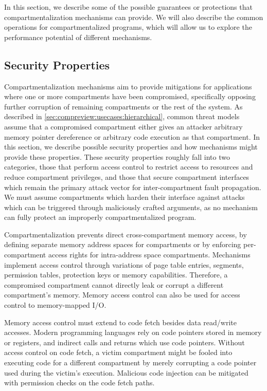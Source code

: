 In this section, we describe some of the possible guarantees or protections
that compartmentalization mechanisms can provide.
We will also describe the common operations for compartmentalized programs,
which will allow us to explore the performance potential of different
mechanisms.

\subsection{Security Properties}
Compartmentalization mechanisms aim to provide mitigations for applications
where one or more compartments have been compromised, specifically opposing
further corruption of remaining compartments or the rest of the system.
As described in \autoref{sec:compreview:usecases:hierarchical}, common threat
models assume that a compromised compartment either gives an attacker arbitrary
memory pointer dereference or arbitrary code execution as that compartment.
In this section, we describe possible security properties and how mechanisms
might provide these properties.
These security properties roughly fall into two categories, those that
perform access control to restrict access to resources and reduce
compartment privileges, and those that secure compartment interfaces
which remain the primary attack vector for inter-compartment fault propagation.
We must assume compartments which harden their interface against attacks
which can be triggered through maliciously crafted arguments, as no
mechanism can fully protect an improperly compartmentalized program.


Compartmentalization prevents direct cross-compartment memory access, by 
defining separate memory address spaces for compartments or by 
enforcing per-compartment access rights for intra-address space compartments.
Mechanisms implement access control through variations of page table entries,
segments, permission tables, protection keys or memory capabilities.
Therefore, a compromised compartment cannot directly leak or corrupt a 
different compartment's memory.
Memory access control can also be used for access control to memory-mapped
I/O.

Memory access control must extend to code fetch besides data read/write
accesses.
Modern programming languages rely on code pointers stored in memory or
registers, and indirect calls and returns which use code pointers.
Without access control on code fetch, a victim compartment might be fooled 
into executing code for a different compartment by merely corrupting a
code pointer used during the victim's execution. 
Malicious code injection can be mitigated with permission checks on the
code fetch paths.

